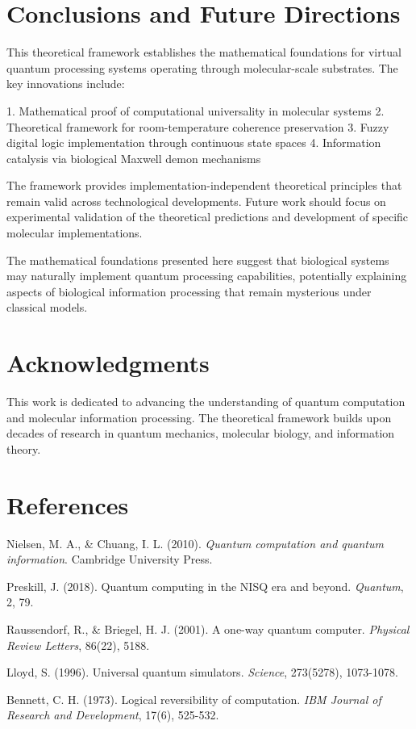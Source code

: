 \documentclass[12pt]{article}
\begin{document}
\section{Conclusions and Future Directions}

This theoretical framework establishes the mathematical foundations for virtual quantum processing systems operating through molecular-scale substrates. The key innovations include:

1. Mathematical proof of computational universality in molecular systems
2. Theoretical framework for room-temperature coherence preservation
3. Fuzzy digital logic implementation through continuous state spaces
4. Information catalysis via biological Maxwell demon mechanisms

The framework provides implementation-independent theoretical principles that remain valid across technological developments. Future work should focus on experimental validation of the theoretical predictions and development of specific molecular implementations.

The mathematical foundations presented here suggest that biological systems may naturally implement quantum processing capabilities, potentially explaining aspects of biological information processing that remain mysterious under classical models.

\section*{Acknowledgments}

This work is dedicated to advancing the understanding of quantum computation and molecular information processing. The theoretical framework builds upon decades of research in quantum mechanics, molecular biology, and information theory.

\section*{References}

\begin{thebibliography}{99}

Nielsen, M. A., \& Chuang, I. L. (2010). \textit{Quantum computation and quantum information}. Cambridge University Press.

Preskill, J. (2018). Quantum computing in the NISQ era and beyond. \textit{Quantum}, 2, 79.

Raussendorf, R., \& Briegel, H. J. (2001). A one-way quantum computer. \textit{Physical Review Letters}, 86(22), 5188.

Lloyd, S. (1996). Universal quantum simulators. \textit{Science}, 273(5278), 1073-1078.

Bennett, C. H. (1973). Logical reversibility of computation. \textit{IBM Journal of Research and Development}, 17(6), 525-532.

\end{thebibliography}
\end{document}
